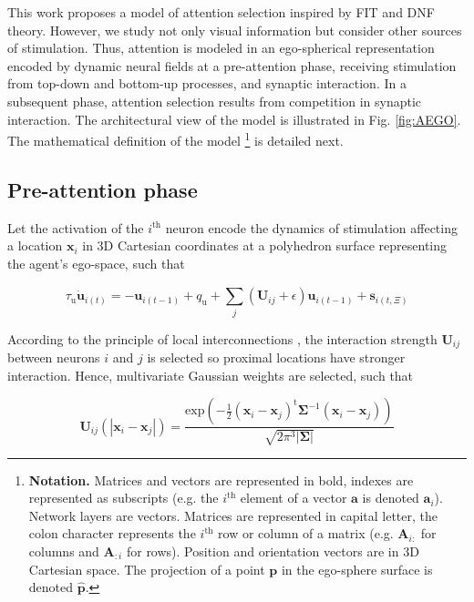 \documentclass[letterpaper, 10 pt, conference]{ieeeconf}  %
\begin{document}
	This work proposes a model of attention selection inspired by FIT and DNF theory. However, we study not only visual information but consider other sources of stimulation. Thus, attention is modeled in an ego-spherical representation encoded by dynamic neural fields at a pre-attention phase, receiving stimulation from top-down and bottom-up processes, and synaptic interaction. In a subsequent phase, attention selection results from competition in synaptic interaction. The architectural view of the model is illustrated in Fig. \ref{fig:AEGO}. The mathematical definition of the model \footnote{\scriptsize \textbf{Notation.} Matrices and vectors are represented in bold, indexes are represented as subscripts (e.g. the $i^{\mathrm{th}}$ element of a vector $\mathbf{a}$ is denoted $\mathbf{a}_{i}$). Network layers are vectors. Matrices are represented in capital letter, the colon character represents the $i^{\mathrm{th}}$ row or column of a matrix (e.g. $\mathbf{A}_{i:}$ for columns and $\mathbf{A}_{:i}$ for rows). Position and orientation vectors are in 3D Cartesian space. The projection of a point $\mathbf{p}$ in the ego-sphere surface is denoted $\mathbf{\hat{p}}$.} is detailed next.
	
	
	\subsection{Pre-attention phase}
	Let the activation of the $i^\mathrm{th}$ neuron encode the dynamics of stimulation affecting a location  $\mathbf{x}_i$ in 3D Cartesian coordinates at a polyhedron surface representing the agent's ego-space, such that 
		
	\begin{equation}
	\tau_\mathrm{u} \dot{\mathbf{u}}_{i(t)} = -\mathbf{u}_{i(t-1)} + q_\mathrm{u} + \sum_{j}^{} (\mathbf{U}_{ij}+\epsilon)\mathbf{u}_{i(t-1)} + \mathbf{s}_{i(t,\Xi)} 
	\label{eq:pre-sel}
	\end{equation}

	According to the principle of local interconnections \cite{samsonovich97}, the interaction strength $\mathbf{U}_{ij}$ between neurons $i$ and $j$ is selected so proximal locations have stronger interaction. Hence, multivariate Gaussian weights are selected, such that
	
	\begin{equation}
		\mathbf{U}_{ij}(|\mathbf{x}_i-\mathbf{x}_j|) = \frac{\mathrm{exp}\left(-\frac{1}{2} (\mathbf{x}_i-\mathbf{x}_j)^{\mathrm{t}}\mathbf{\Sigma}^{-1}(\mathbf{x}_i-\mathbf{x}_j)\right)}{\sqrt{2\pi^{3}|\mathbf{\Sigma}|}}	
	\label{eq:pre-sel-syn}
	\end{equation}
	
\end{document}
